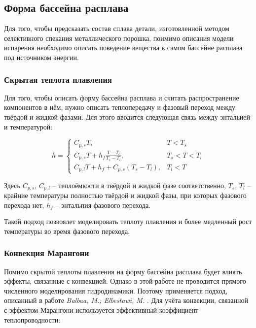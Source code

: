 
\subsection{Форма бассейна расплава}

Для того, чтобы предсказать состав сплава детали, изготовленной методом селективного спекания металлического порошка, поимимо описания модели испарения необходимо описать поведение вещества в самом бассейне расплава под источником энергии. 

\subsubsection{Скрытая теплота плавления}

Для того, чтобы описать форму бассейна расплава и считать распространение компонентов в нём, нужно описать теплопередачу и фазовый переход между твёрдой и жидкой фазами.
Для этого вводится следующая связь между энтальией и температурой:

\begin{equation}
h=
\begin{cases}
    C_{p,s}T, & T<T_s \\
    C_{p,s}T + h_f\frac{T-T_l}{T_s-T_l}, & T_s <T<T_l \\
    C_{p,l}T + h_f + C_{p,s}(T_s - T_l), & T_l < T
\end{cases}
\end{equation}

Здесь $C_{p,s}$, $C_{p,l}$ -- теплоёмкости в твёрдой и жидкой фазе соответственно, $T_s$, $T_l$ -- крайние температуры полностью твёрдой и жидкой фазы, при которых фазового перехода нет, $h_f$ -- энтальпия фазового перехода.

Такой подход позвоялет моделировать теплоту плавления и более медленный рост температуры во время фазового перехода.

\subsubsection{Конвекция Марангони}

Помимо скрытой теплоты плавления на форму бассейна расплава будет влиять эффекты, связанные с конвекцией. Однако в этой работе не проводится прямого численного моделирования гидродинамики. Поэтому применяется подход, описанный в работе 
\textit{Balbaa, M.; Elbestawi, M.} 
\cite{balbaa2022multi}.
Для учёта конвекции, связанной с эффектом Марангони используется эффективный коэффициент теплопроводности:

